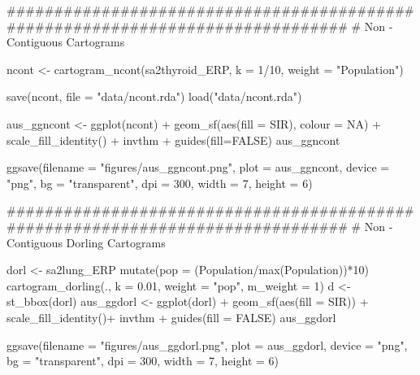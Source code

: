 \begin{Schunk}
\begin{Sinput}
###############################################################################
# Non - Contiguous Cartograms

ncont <- cartogram_ncont(sa2thyroid_ERP, k = 1/10,
                         weight = "Population") %

save(ncont, file = "data/ncont.rda")
load("data/ncont.rda")

aus_ggncont <- ggplot(ncont) + 
  geom_sf(aes(fill = SIR), colour = NA) + 
  scale_fill_identity() + 
  invthm + guides(fill=FALSE)
aus_ggncont

ggsave(filename = "figures/aus_ggncont.png", plot = aus_ggncont,
       device = "png", bg = "transparent", dpi = 300,  width = 7, height = 6)
\end{Sinput}
\end{Schunk}

\begin{Schunk}
\begin{Sinput}
###############################################################################
# Non - Contiguous Dorling Cartograms

dorl <- sa2lung_ERP %
  mutate(pop = (Population/max(Population))*10) %
  cartogram_dorling(., k = 0.01, weight = "pop", m_weight = 1) %
d <- st_bbox(dorl)
aus_ggdorl <- ggplot(dorl) + 
  geom_sf(aes(fill = SIR)) + 
  scale_fill_identity()+
  invthm + guides(fill = FALSE)
aus_ggdorl

ggsave(filename = "figures/aus_ggdorl.png", plot = aus_ggdorl,
       device = "png", bg = "transparent", dpi = 300,  width = 7, height = 6)
\end{Sinput}
\end{Schunk}

